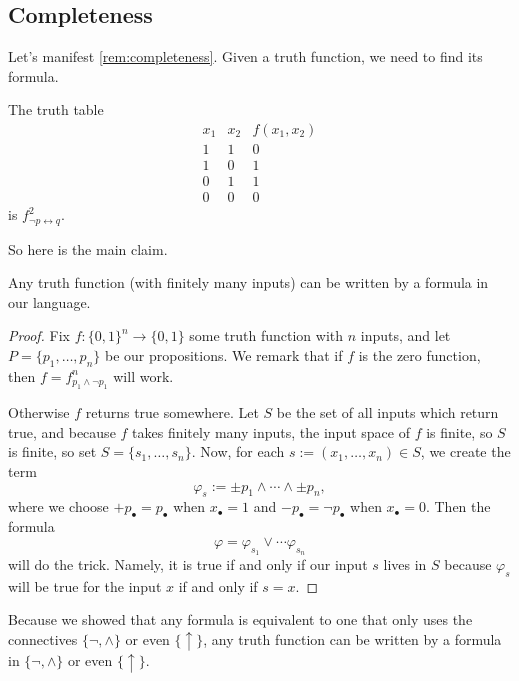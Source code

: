 \subsection{Completeness}
Let's manifest \autoref{rem:completeness}. Given a truth function, we need to find its formula.
\begin{example}
	The truth table
	\[\begin{array}{c|c||c}
		x_1 & x_2 & f(x_1,x_2) \\
		\hline
		1 & 1 & 0 \\
		1 & 0 & 1 \\
		0 & 1 & 1 \\
		0 & 0 & 0
	\end{array}\]
	is $f_{\lnot p\leftrightarrow q}^2$.
\end{example}
So here is the main claim.
\begin{theorem}
	Any truth function (with finitely many inputs) can be written by a formula in our language.
\end{theorem}
\begin{proof}
	Fix $f:\{0,1\}^n\to\{0,1\}$ some truth function with $n$ inputs, and let $P=\{p_1,\ldots,p_n\}$ be our propositions. We remark that if $f$ is the zero function, then $f=f_{p_1\land\lnot p_1}^n$ will work.

	Otherwise $f$ returns true somewhere. Let $S$ be the set of all inputs which return true, and because $f$ takes finitely many inputs, the input space of $f$ is finite, so $S$ is finite, so set $S=\{s_1,\ldots,s_n\}$. Now, for each $s:=(x_1,\ldots,x_n)\in S$, we create the term
	\[\varphi_s:=\pm p_1\land\cdots\land\pm p_n,\]
	where we choose $+p_\bullet=p_\bullet$ when $x_\bullet=1$ and $-p_\bullet=\lnot p_\bullet$ when $x_\bullet=0$. Then the formula
	\[\varphi=\varphi_{s_1}\lor\cdots\varphi_{s_n}\]
	will do the trick. Namely, it is true if and only if our input $s$ lives in $S$ because $\varphi_s$ will be true for the input $x$ if and only if $s=x$.
\end{proof}
\begin{remark}
	Because we showed that any formula is equivalent to one that only uses the connectives $\{\lnot,\land\}$ or even $\{\uparrow\}$, any truth function can be written by a formula in $\{\lnot,\land\}$ or even $\{\uparrow\}$.
\end{remark}